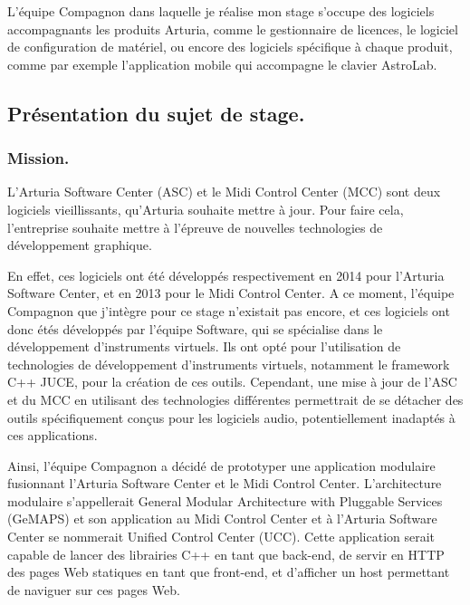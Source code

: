 \documentclass[francais]{rapportPFE}  %
\begin{document}
L'équipe Compagnon dans laquelle je réalise mon stage s'occupe des logiciels accompagnants les produits Arturia, comme le gestionnaire de licences, le logiciel de configuration de matériel, ou encore des logiciels spécifique à chaque produit, comme par exemple l'application mobile qui accompagne le clavier AstroLab. 

\subsection{Présentation du sujet de stage.}


\subsubsection{Mission.}

L'Arturia Software Center (ASC) et le Midi Control Center (MCC) sont deux logiciels vieillissants, qu'Arturia souhaite mettre à jour. Pour faire cela, l'entreprise souhaite mettre à l'épreuve de nouvelles technologies de développement graphique.

En effet, ces logiciels ont été développés respectivement en 2014 pour l'Arturia Software Center, et en 2013 pour le Midi Control Center. A ce moment, l'équipe Compagnon que j'intègre pour ce stage n'existait pas encore, et ces logiciels ont donc étés développés par l'équipe Software, qui se spécialise dans le développement d'instruments virtuels. Ils ont opté pour l'utilisation de technologies de développement d'instruments virtuels, notamment le framework C++ JUCE, pour la création de ces outils. Cependant, une mise à jour de l'ASC et du MCC en utilisant des technologies différentes permettrait de se détacher des outils spécifiquement conçus pour les logiciels audio, potentiellement inadaptés à ces applications.

Ainsi, l'équipe Compagnon a décidé de prototyper une application modulaire fusionnant l'Arturia Software Center et le Midi Control Center. L'architecture modulaire s'appellerait General Modular Architecture with Pluggable Services (GeMAPS) et son application au Midi Control Center et à l'Arturia Software Center se nommerait Unified Control Center (UCC). Cette application serait capable de lancer des librairies C++ en tant que back-end, de servir en HTTP des pages Web statiques en tant que front-end, et d'afficher un host permettant de naviguer sur ces pages Web. 
\end{document}
